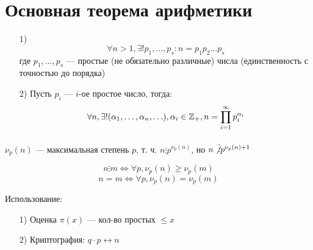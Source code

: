 \section{Основная теорема арифметики}
\begin{theorem}[ОТА]
\label{theorem:extra_1}
\begin{itemize}
  \item [1) ]
    \[
      \forall n > 1, \exists! p_1, \ldots, p_s \colon n = p_1 p_2 \ldots p_s
    \]
    где $p_1, \ldots, p_s$ --- простые (не обязательно различные) числа (единственность с точностью до порядка)
  \item [2) ] Пусть $p_i$ --- $i$-ое простое число, тогда:
    \[
    \forall n, \exists! (\alpha_1, \ldots, \alpha_n, \ldots), \alpha_i \in \mathbb{Z}_+, n = \prod_{i = 1}^{\infty} p_i^{\alpha_i}
    \]
\end{itemize}
\end{theorem}
\begin{definition}
  $\nu_p(n)$ --- максимальная степень $p$, т. ч. $n \vdots p ^{\nu_p(n)}$, но $n \not\vdots p ^{\nu_p(n) + 1}$
\end{definition}
\begin{note}
  \[
  n \vdots m \iff \forall p, \nu_p(n) \geq \nu_p(m)
  \]
  \[
  n = m \iff \forall p, \nu_p(n) = \nu_p(m)
  \]
\end{note}
Использование:
\begin{itemize}
  \item [1) ] Оценка $\pi(x)$ --- кол-во простых $\leq x$
  \item [2) ] Криптография: $q \cdot p \longleftrightarrow n$
\end{itemize}


